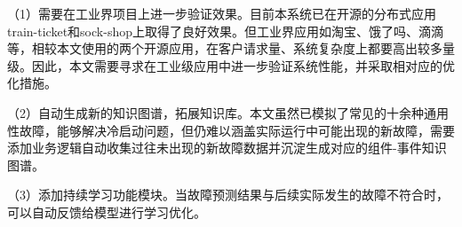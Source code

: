 （1）需要在工业界项目上进一步验证效果。目前本系统已在开源的分布式应用train-ticket和sock-shop上取得了良好效果。但工业界应用如淘宝、饿了吗、滴滴等，相较本文使用的两个开源应用，在客户请求量、系统复杂度上都要高出较多量级。因此，本文需要寻求在工业级应用中进一步验证系统性能，并采取相对应的优化措施。

（2）自动生成新的知识图谱，拓展知识库。本文虽然已模拟了常见的十余种通用性故障，能够解决冷启动问题，但仍难以涵盖实际运行中可能出现的新故障，需要添加业务逻辑自动收集过往未出现的新故障数据并沉淀生成对应的组件-事件知识图谱。

（3）添加持续学习功能模块。当故障预测结果与后续实际发生的故障不符合时，可以自动反馈给模型进行学习优化。